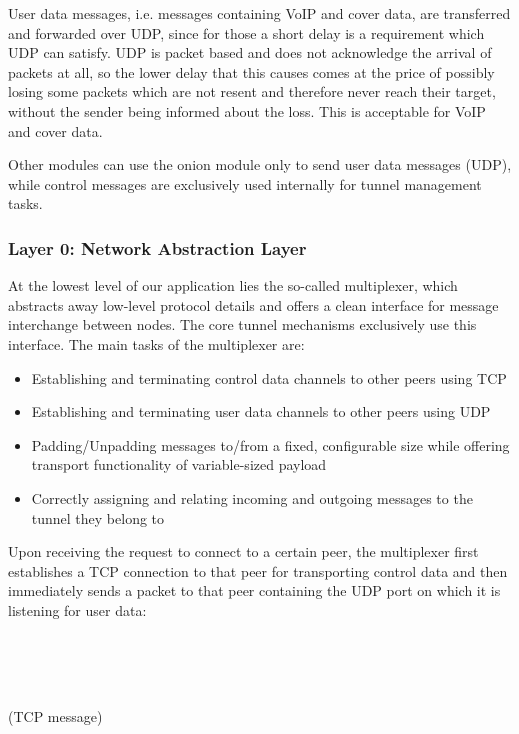 \documentclass{article}
\begin{document}
User data messages, i.e. messages containing VoIP and cover data, are transferred and forwarded over UDP, since for those a short delay is a requirement which UDP can satisfy. UDP is packet based and does not acknowledge the arrival of packets at all, so the lower delay that this causes comes at the price of possibly losing some packets which are not resent and therefore never reach their target, without the sender being informed about the loss. This is acceptable for VoIP and cover data.

Other modules can use the onion module only to send user data messages (UDP), while control messages are exclusively used internally for tunnel management tasks.

\subsubsection{Layer 0: Network Abstraction Layer}

At the lowest level of our application lies the so-called multiplexer, which abstracts away low-level protocol details and offers a clean interface for message interchange between nodes. The core tunnel mechanisms exclusively use this interface. The main tasks of the multiplexer are:
\begin{itemize}
	\item Establishing and terminating control data channels to other peers using TCP
	\item Establishing and terminating user data channels to other peers using UDP
	\item Padding/Unpadding messages to/from a fixed, configurable size while offering transport functionality of variable-sized payload
	\item Correctly assigning and relating incoming and outgoing messages to the tunnel they belong to
\end{itemize}
Upon receiving the request to connect to a certain peer, the multiplexer first establishes a TCP connection to that peer for transporting control data and then immediately sends a packet to that peer containing the UDP port on which it is listening for user data: \\

	\begin{bytefield}[bitwidth=1.0em]{32}
		 \\
		 \\
	\end{bytefield} \\
(TCP message)
\end{document}
